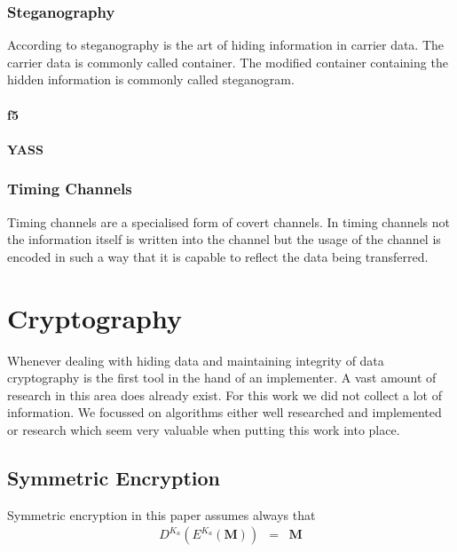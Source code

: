 \subsubsection{Steganography}
According to \cite{wiki:steganographie} steganography is the art of hiding information in carrier data. The carrier data is commonly called container. The modified container containing the hidden information is commonly called steganogram.

\cite{subhedar2014current}


\paragraph{f5}

\paragraph{YASS}


\subsubsection{Timing Channels}
Timing channels are a specialised form of covert channels. In timing channels not the information itself is written into the channel but the usage of the channel is encoded in such a way that it is capable to reflect the data being transferred.


\section{Cryptography}
Whenever dealing with hiding data and maintaining integrity of data cryptography is the first tool in the hand of an implementer. A vast amount of research in this area does already exist. For this work we did not collect a lot of information. We focussed on algorithms either well researched and implemented or research which seem very valuable when putting this work into place. 

\subsection{Symmetric Encryption}
Symmetric encryption in this paper assumes always that
\begin{eqnarray}
	D^{K_a}\left(E^{K_a}\left(\mathbf{M}\right)\right) & = & \mathbf{M}
\end{eqnarray} 


